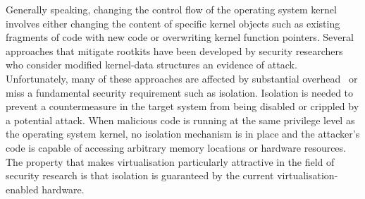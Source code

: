 Generally speaking, changing the control flow of the operating system kernel involves either changing the content of specific kernel objects such as existing fragments of code with new code or overwriting kernel function pointers.
Several approaches that mitigate rootkits have been developed by security researchers who consider modified kernel-data structures an evidence of attack. Unfortunately, many of these approaches are affected by substantial overhead~\cite{livewire,5} or miss a fundamental security requirement such as isolation\cite{hookscout}. 
Isolation is needed to prevent a countermeasure in the target system from being disabled or crippled by a potential attack. When malicious code is running at the same privilege level as the operating system kernel, no isolation mechanism is in place and the attacker's code is capable of accessing arbitrary memory locations or hardware resources.
The property that makes virtualisation particularly attractive in the field of security research is that isolation is guaranteed by the current virtualisation-enabled hardware. 

